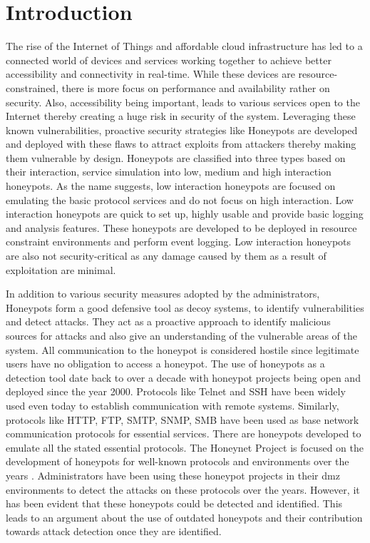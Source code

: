 \section{Introduction}

The rise of the Internet of Things and affordable cloud infrastructure has led to a connected world of devices and services working together to achieve better accessibility and connectivity in real-time. While these devices are resource-constrained, there is more focus on performance and availability rather on security. Also, accessibility being important, leads to various services open to the Internet thereby creating a huge risk in security of the system. Leveraging these known vulnerabilities, proactive security strategies like Honeypots are developed and deployed with these flaws to attract exploits from attackers thereby making them vulnerable by design. Honeypots are classified into three types based on their interaction, service simulation into low, medium and high interaction honeypots. As the name suggests, low interaction honeypots are focused on emulating the basic protocol services and do not focus on high interaction. Low interaction honeypots are quick to set up, highly usable and provide basic logging and analysis features. These honeypots are developed to be deployed in resource constraint environments and perform event logging. Low interaction honeypots are also not security-critical as any damage caused by them as a result of exploitation are minimal.

In addition to various security measures adopted by the administrators, Honeypots form a good defensive tool as decoy systems, to identify vulnerabilities and detect attacks. They act as a proactive approach to identify malicious sources for attacks and also give an understanding of the vulnerable areas of the system. All communication to the honeypot is considered hostile since legitimate users have no obligation to access a honeypot. The use of honeypots as a detection tool date back to over a decade with honeypot projects being open and deployed since the year 2000. Protocols like Telnet and SSH have been widely used even today to establish communication with remote systems. Similarly, protocols like HTTP, FTP, SMTP, SNMP, SMB have been used as base network communication protocols for essential services. There are honeypots developed to emulate all the stated essential protocols. The Honeynet Project is focused on the development of honeypots for well-known protocols and environments over the years \cite{Honeynet}. Administrators have been using these honeypot projects in their \acrshort{dmz} environments to detect the attacks on these protocols over the years. However, it has been evident that these honeypots could be detected and identified. This leads to an argument about the use of outdated honeypots and their contribution towards attack detection once they are identified\cite{counting}.

